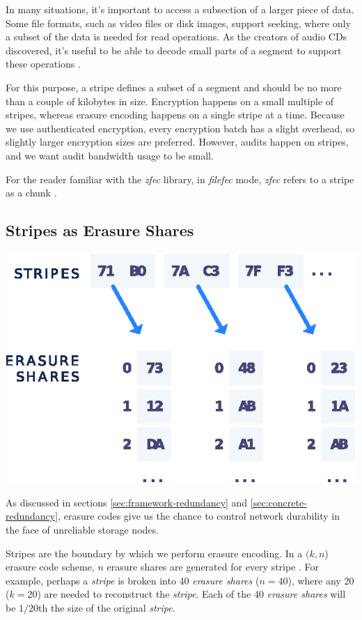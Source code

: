 \documentclass[8pt,fleqn,openany]{book}
\begin{document}
In many situations, it's important to access a subsection of a larger piece of
data. Some file formats, such as video files or disk images, support seeking,
where only a subset of the data is needed for read operations.
As the creators of audio CDs discovered,
it's useful to be able to decode small parts of a segment
to support these operations \cite{rs-cd}.

For this purpose, a stripe defines a subset of a segment
and should be no more than a
couple of kilobytes in size. Encryption happens on a small multiple of stripes,
whereas erasure encoding happens on a single stripe at a time. Because we
use authenticated encryption, every encryption batch has a slight overhead,
so slightly larger encryption sizes are preferred. However, audits
happen on stripes, and we want audit bandwidth usage to be small.

For the reader familiar with the {\em zfec} library, in {\em filefec} mode,
{\em zfec} refers to a stripe as a chunk \cite{filefec-packing}.

\subsection{Stripes as Erasure Shares}\label{stripes-as-erasure-shares}

\begin{center}
\includegraphics[width=.45\textwidth]{images/stripe-share.eps}
\end{center}

As discussed in sections \ref{sec:framework-redundancy} and
\ref{sec:concrete-redundancy}, erasure codes
give us the chance to control network durability in the face
of unreliable storage nodes.

Stripes are the boundary by which we perform erasure encoding.
In a $(k, n$) erasure code scheme, $n$ erasure shares are generated for
every stripe \cite{rs}.
For example, perhaps a {\em stripe} is broken into 40 {\em erasure shares}
($n=40$), where any 20 ($k=20$) are needed to reconstruct the {\em stripe}. Each
of the 40 {\em erasure shares} will be $1/20$th the size of the original
{\em stripe}.
\end{document}
